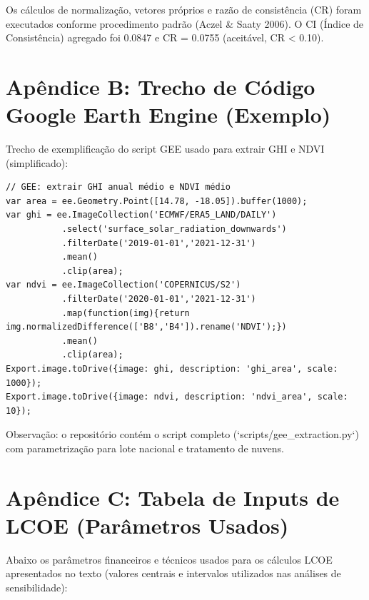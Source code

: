 \documentclass[12pt, a4paper]{article}
\begin{document}
Os cálculos de normalização, vetores próprios e razão de consistência (CR) foram executados conforme procedimento padrão (Aczel \& Saaty 2006). O CI (Índice de Consistência) agregado foi 0.0847 e CR = 0.0755 (aceitável, CR < 0.10).

\section*{Apêndice B: Trecho de Código Google Earth Engine (Exemplo)}

Trecho de exemplificação do script GEE usado para extrair GHI e NDVI (simplificado):

\begin{verbatim}
// GEE: extrair GHI anual médio e NDVI médio
var area = ee.Geometry.Point([14.78, -18.05]).buffer(1000);
var ghi = ee.ImageCollection('ECMWF/ERA5_LAND/DAILY')
           .select('surface_solar_radiation_downwards')
           .filterDate('2019-01-01','2021-12-31')
           .mean()
           .clip(area);
var ndvi = ee.ImageCollection('COPERNICUS/S2')
           .filterDate('2020-01-01','2021-12-31')
           .map(function(img){return img.normalizedDifference(['B8','B4']).rename('NDVI');})
           .mean()
           .clip(area);
Export.image.toDrive({image: ghi, description: 'ghi_area', scale: 1000});
Export.image.toDrive({image: ndvi, description: 'ndvi_area', scale: 10});
\end{verbatim}

Observação: o repositório contém o script completo (`scripts/gee_extraction.py`) com parametrização para lote nacional e tratamento de nuvens.

\section*{Apêndice C: Tabela de Inputs de LCOE (Parâmetros Usados)}

Abaixo os parâmetros financeiros e técnicos usados para os cálculos LCOE apresentados no texto (valores centrais e intervalos utilizados nas análises de sensibilidade):
\end{document}
